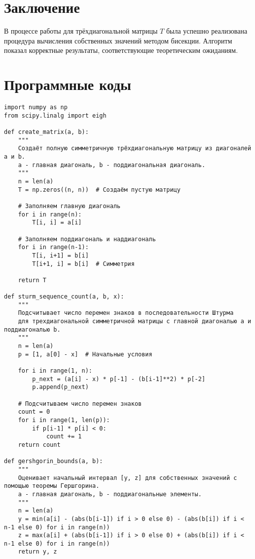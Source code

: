 \documentclass{article}
\begin{document}
\section*{Заключение}

 



В процессе работы для трёхдиагональной матрицы $T$ была успешно реализована процедура вычисления собственных значений методом бисекции. Алгоритм показал корректные результаты, соответствующие теоретическим ожиданиям.
   
\section*{Программные коды}
\begin{verbatim}
import numpy as np
from scipy.linalg import eigh

def create_matrix(a, b):
    """
    Создаёт полную симметричную трёхдиагональную матрицу из диагоналей a и b.
    a - главная диагональ, b - поддиагональная диагональ.
    """
    n = len(a)
    T = np.zeros((n, n))  # Создаём пустую матрицу
    
    # Заполняем главную диагональ
    for i in range(n):
        T[i, i] = a[i]
    
    # Заполняем поддиагональ и наддиагональ
    for i in range(n-1):
        T[i, i+1] = b[i]
        T[i+1, i] = b[i]  # Симметрия
    
    return T

def sturm_sequence_count(a, b, x):
    """
    Подсчитывает число перемен знаков в последовательности Штурма
    для трехдиагональной симметричной матрицы с главной диагональю a и поддиагональю b.
    """
    n = len(a)
    p = [1, a[0] - x]  # Начальные условия
    
    for i in range(1, n):
        p_next = (a[i] - x) * p[-1] - (b[i-1]**2) * p[-2]
        p.append(p_next)
    
    # Подсчитываем число перемен знаков
    count = 0
    for i in range(1, len(p)):
        if p[i-1] * p[i] < 0:
            count += 1
    return count

def gershgorin_bounds(a, b):
    """
    Оценивает начальный интервал [y, z] для собственных значений с помощью теоремы Гершгорина.
    a - главная диагональ, b - поддиагональные элементы.
    """
    n = len(a)
    y = min(a[i] - (abs(b[i-1]) if i > 0 else 0) - (abs(b[i]) if i < n-1 else 0) for i in range(n))
    z = max(a[i] + (abs(b[i-1]) if i > 0 else 0) + (abs(b[i]) if i < n-1 else 0) for i in range(n))
    return y, z


\end{verbatim}
\end{document}

